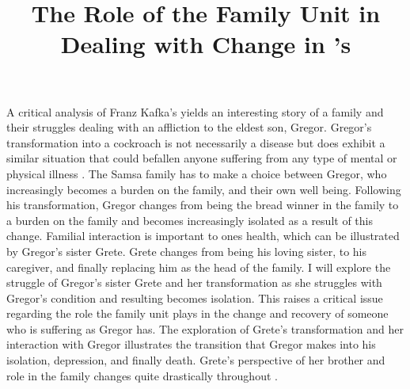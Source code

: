 \documentclass{article}
\title{The Role of the Family Unit in Dealing with Change in
\citeauthor{kafka2007meta}'s \citetitle{kafka2007meta}}
\begin{document}
\makeheader

A critical analysis of Franz Kafka's  yields an
interesting story of a family and their struggles dealing with an affliction
to the eldest son, Gregor. Gregor's transformation into a cockroach is not
necessarily a disease but does exhibit a similar situation that could
befallen anyone suffering from any type of mental or physical illness
\cite[267]{rowe2002}. The Samsa family has to make a choice between Gregor,
who increasingly becomes a burden on the family, and their own well being.
Following his transformation, Gregor changes from being the bread winner in
the family to a burden on the family and becomes increasingly isolated as a
result of this change. Familial interaction is important to ones health,
which can be illustrated by Gregor's sister Grete. Grete changes from being
his loving sister, to his caregiver, and finally replacing him as the head
of the family. I will explore the struggle of Gregor's sister Grete and her
transformation as she struggles with Gregor's condition and resulting
becomes isolation. This raises a critical issue regarding the role the
family unit plays in the change and recovery of someone who is suffering as
Gregor has. The exploration of Grete's transformation and her interaction
with Gregor illustrates the transition that Gregor makes into his isolation,
depression, and finally death. Grete's perspective of her brother and role
in the family changes quite drastically throughout .

\end{document}
